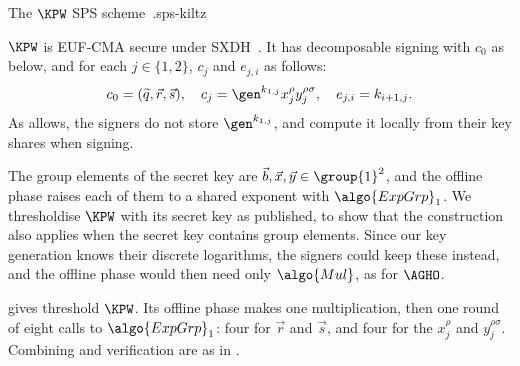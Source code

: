 \begin{primitivebox}{The $\KPW$ SPS scheme~\cite{C:KilPanWee15}.}{sps-kiltz}
\begin{description}
  \end{description}

\end{primitivebox}

$\KPW$ is EUF-CMA secure under SXDH~\cite{C:KilPanWee15}. It has decomposable
signing with $c_0$ as below, and for each $j \in \{1, 2\}$, $c_j$ and $e_{j,i}$
as follows:
%
\begin{equation*}
%
  c_0 = (\widetilde{q}, \vec{r}, \vec{s}), \quad c_j = \gen^{k_{1,j}}
x_j^{\rho} y_j^{\rho\sigma}, \quad e_{j,i} = k_{i+1,j}.
%
\end{equation*}
%
As  allows, the signers do not store $\gen^{k_{1,j}}$,
and compute it locally from their key shares when signing.

The group elements of the secret key are $\vec{b}, \vec{x}, \vec{y} \in
\group{1}^2$, and the offline phase raises each of them to a shared exponent
with $\algo{ExpGrp}_1$. We thresholdise $\KPW$ with its secret key as
published, to show that the construction also applies when the secret key
contains group elements. Since our key generation knows their discrete
logarithms, the signers could keep these instead, and the offline phase would
then need only $\algo{Mul}$, as for $\AGHO$.

 gives threshold $\KPW$. Its offline phase makes one
multiplication, then one round of eight calls to $\algo{ExpGrp}_1$: four for
$\vec{r}$ and $\vec{s}$, and four for the $x_j^{\rho}$ and $y_j^{\rho\sigma}$.
Combining and verification are as in .


